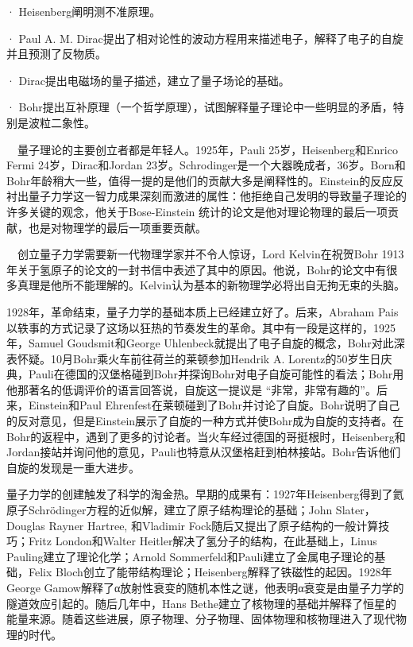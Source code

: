 \documentclass[13pt,a4paper]{article}
\begin{document}
\begin{CJK}{UTF8}{song}
· Heisenberg阐明测不准原理。

· Paul A. M. Dirac提出了相对论性的波动方程用来描述电子，解释了电子的自旋并且预测了反物质。

· Dirac提出电磁场的量子描述，建立了量子场论的基础。

· Bohr提出互补原理（一个哲学原理），试图解释量子理论中一些明显的矛盾，特别是波粒二象性。

\ \ 量子理论的主要创立者都是年轻人。1925年，Pauli 25岁，Heisenberg和Enrico Fermi 24岁，Dirac和Jordan 23岁。\newline Schrodinger是一个大器晚成者，36岁。Born和Bohr年龄稍大一些，值得一提的是他们的贡献大多是阐释性的。Einstein的反应反衬出量子力学这一智力成果深刻而激进的属性：他拒绝自己发明的导致量子理论的许多关键的观念，他关于Bose-Einstein 统计的论文是他对理论物理的最后一项贡献，也是对物理学的最后一项重要贡献。

\ \ 创立量子力学需要新一代物理学家并不令人惊讶，Lord Kelvin在祝贺Bohr 1913年关于氢原子的论文的一封书信中表述了其中的原因。他说，Bohr的论文中有很多真理是他所不能理解的。Kelvin认为基本的新物理学必将出自无拘无束的头脑。

1928年，革命结束，量子力学的基础本质上已经建立好了。后来，Abraham Pais以轶事的方式记录了这场以狂热的节奏发生的革命。其中有一段是这样的，1925年，Samuel Goudsmit和George Uhlenbeck就提出了电子自旋的概念，Bohr对此深表怀疑。10月Bohr乘火车前往荷兰的莱顿参加Hendrik A. Lorentz的50岁生日庆典，Pauli在德国的汉堡格碰到Bohr并探询Bohr对电子自旋可能性的看法；Bohr用他那著名的低调评价的语言回答说，自旋这一提议是 “非常，非常有趣的”。后来，Einstein和Paul Ehrenfest在莱顿碰到了Bohr并讨论了自旋。Bohr说明了自己的反对意见，但是Einstein展示了自旋的一种方式并使Bohr成为自旋的支持者。在Bohr的返程中，遇到了更多的讨论者。当火车经过德国的哥挺根时，Heisenberg和Jordan接站并询问他的意见，Pauli也特意从汉堡格赶到柏林接站。Bohr告诉他们自旋的发现是一重大进步。

量子力学的创建触发了科学的淘金热。早期的成果有：1927年Heisenberg得到了氦原子Schrödinger方程的近似解，建立了原子结构理论的基础；John Slater，Douglas Rayner Hartree, 和Vladimir Fock随后又提出了原子结构的一般计算技巧；Fritz London和Walter Heitler解决了氢分子的结构，在此基础上，Linus Pauling建立了理论化学；Arnold Sommerfeld和Pauli建立了金属电子理论的基础，Felix Bloch创立了能带结构理论；Heisenberg解释了铁磁性的起因。1928年George Gamow解释了α放射性衰变的随机本性之谜，他表明α衰变是由量子力学的隧道效应引起的。随后几年中，Hans Bethe建立了核物理的基础并解释了恒星的能量来源。随着这些进展，原子物理、分子物理、固体物理和核物理进入了现代物理的时代。
 

\end{CJK}
\end{document}
